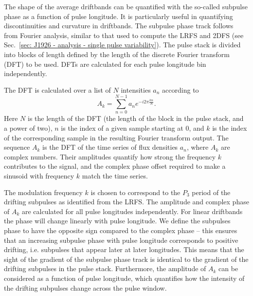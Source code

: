 The shape of the average driftbands can be quantified with the so-called subpulse phase as a function of pulse longitude. It is particularly useful in quantifying discontinuities and curvature in driftbands. The subpulse phase track follows from Fourier analysis, similar to that used to compute the LRFS and 2DFS (see Sec.~\ref{sec: J1926 - analysis - single pulse variability}). The pulse stack is divided into blocks of length defined by the length of the discrete Fourier transform (DFT) to be used. DFTs are calculated for each pulse longitude bin independently.

The DFT is calculated over a list of $N$ intensities $a_n$ according to
\begin{equation}
    A_k = \sum^{N-1}_{n=0} a_n e^{-i2\pi \frac{kn}{N}}.
\end{equation}
Here $N$ is the length of the DFT (the length of the block in the pulse stack, and a power of two), $n$ is the index of a given sample starting at $0$, and $k$ is the index of the corresponding sample in the resulting Fourier transform output. The sequence $A_k$ is the DFT of the time series of flux densities $a_n$, where $A_k$ are complex numbers. Their amplitudes quantify how strong the frequency $k$ contributes to the signal, and the complex phase offset required to make a sinusoid with frequency $k$ match the time series. 

The modulation frequency $k$ is chosen to correspond to the $P_3$ period of the drifting subpulses as identified from the LRFS. The amplitude and complex phase of $A_k$ are calculated for all pulse longitudes independently. For linear driftbands the phase will change linearly with pulse longitude. We define the subpulses phase to have the opposite sign compared to the complex phase -- this ensures that an increasing subpulse phase with pulse longitude corresponds to positive drifting, i.e. subpulses that appear later at later longitudes. This means that the sight of the gradient of the subpulse phase track is identical to the gradient of the drifting subpulses in the pulse stack. Furthermore, the amplitude of $A_k$ can be considered as a function of pulse longitude, which quantifies how the intensity of the drifting subpulses change across the pulse window.


